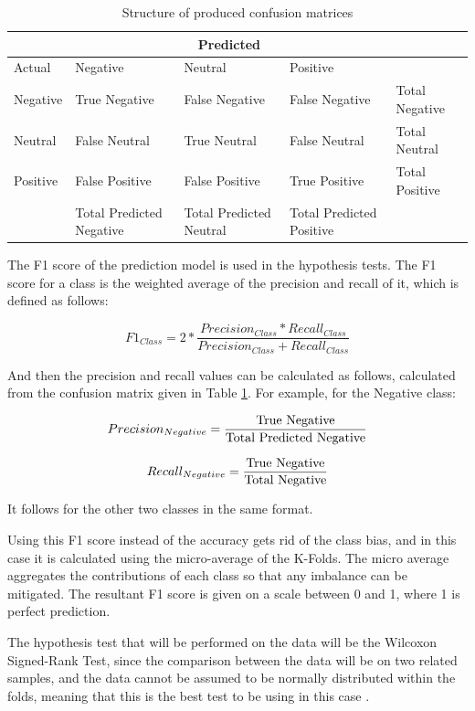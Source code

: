 \begin{table}
\centering
\begin{tabular}{|p{3cm}|p{3cm}|p{3cm}|p{3cm}|p{3cm}|}
 \hline
  & \multicolumn{3}{|c|}{Predicted} & \\
 \hline
   Actual & Negative & Neutral & Positive & \\
    \hline
    Negative &  True Negative   &  False Negative  & False Negative & Total Negative \\
    Neutral & False Neutral & True Neutral&  False Neutral & Total Neutral \\
    Positive & False Positive & False Positive &  True Positive & Total Positive \\
    \hline
    & Total Predicted Negative & Total Predicted Neutral & Total Predicted Positive & \\
 \hline
\end{tabular}
\caption{Structure of produced confusion matrices}
\label{conmat}
\end{table}

The F1 score of the prediction model is used in the hypothesis tests. The F1 score for a class is the weighted average of the precision and recall of it, which is defined as follows: 

$$ F1_{Class} = 2 * \frac{Precision_{Class} * Recall_{Class}}{Precision_{Class} + Recall_{Class}} $$

And then the precision and recall values can be calculated as follows, calculated from the confusion matrix given in Table \ref{conmat}.
For example, for the Negative class:

$$ Precision_{Negative} = \frac{\textnormal{True Negative}}{\textnormal{Total Predicted Negative}} $$

$$ Recall_{Negative} = \frac{\textnormal{True Negative}}{\textnormal{Total Negative}} $$

It follows for the other two classes in the same format.

Using this F1 score instead of the accuracy gets rid of the class bias, and in this case it is calculated using the micro-average of the K-Folds. The micro average aggregates the contributions of each class so that any imbalance can be mitigated. The resultant F1 score is given on a scale between 0 and 1, where 1 is perfect prediction.

The hypothesis test that will be performed on the data will be the Wilcoxon Signed-Rank Test, since the comparison between the data will be on two related samples, and the data cannot be assumed to be normally distributed within the folds, meaning that this is the best test to be using in this case \cite{wilcoxon1970critical}.

